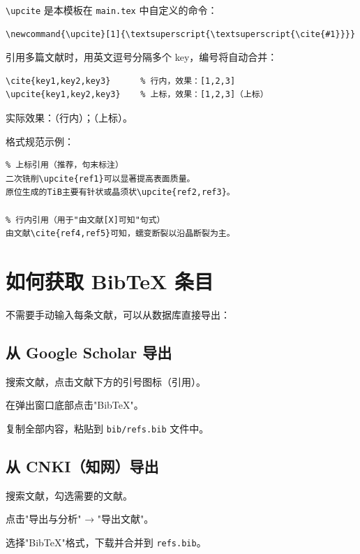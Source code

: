 \verb|\upcite| 是本模板在 \texttt{main.tex} 中自定义的命令：
\begin{verbatim}
\newcommand{\upcite}[1]{\textsuperscript{\textsuperscript{\cite{#1}}}}
\end{verbatim}

引用多篇文献时，用英文逗号分隔多个 key，编号将自动合并：
\begin{verbatim}
\cite{key1,key2,key3}      % 行内，效果：[1,2,3]
\upcite{key1,key2,key3}    % 上标，效果：[1,2,3]（上标）
\end{verbatim}
实际效果：\cite{MARTIN20131497,KIBEDI200235}（行内）；（上标）。

格式规范示例：

\begin{verbatim}
% 上标引用（推荐，句末标注）
二次铣削\upcite{ref1}可以显著提高表面质量。
原位生成的TiB主要有针状或晶须状\upcite{ref2,ref3}。

% 行内引用（用于"由文献[X]可知"句式）
由文献\cite{ref4,ref5}可知，蠕变断裂以沿晶断裂为主。
\end{verbatim}

\section{如何获取 BibTeX 条目}

不需要手动输入每条文献，可以从数据库直接导出：

\subsection{从 Google Scholar 导出}

\begin{compactenum}
    \item 搜索文献，点击文献下方的引号图标（引用）。
    \item 在弹出窗口底部点击"BibTeX"。
    \item 复制全部内容，粘贴到 \texttt{bib/refs.bib} 文件中。
\end{compactenum}

\subsection{从 CNKI（知网）导出}

\begin{compactenum}
    \item 搜索文献，勾选需要的文献。
    \item 点击"导出与分析" → "导出文献"。
    \item 选择"BibTeX"格式，下载并合并到 \texttt{refs.bib}。
\end{compactenum}

